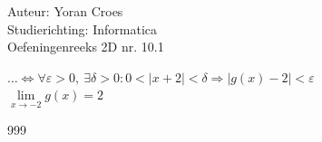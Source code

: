 \documentclass[a4paper]{article}
\begin{document}
\noindent \large Auteur: Yoran Croes \\
\noindent \large Studierichting: Informatica\\
\noindent \large Oefeningenreeks 2D nr. 10.1\\

\medskip

\normalsize

$\ldots \iff 
\forall \varepsilon > 0,\ \exists \delta > 0 :
0 < |x + 2| < \delta \Rightarrow |g(x) - 2| < \varepsilon$ \\

$\lim\limits_{x \rightarrow -2} g(x) = 2$ \\

\begin{thebibliography}{999}
\end{thebibliography}
\end{document}
